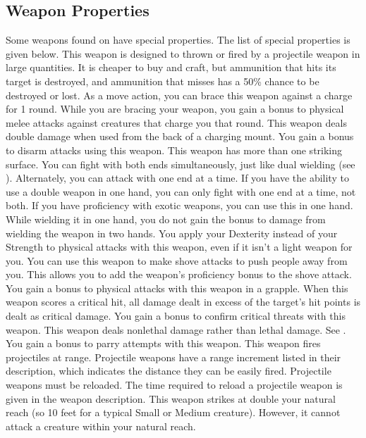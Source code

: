\subsection{Weapon Properties}
Some weapons found on  have special properties. The list of special properties is given below.
 This weapon is designed to thrown or fired by a projectile weapon in large quantities. It is cheaper to buy and craft, but ammunition that hits its target is destroyed, and ammunition that misses has a 50\% chance to be destroyed or lost.
 As a move action, you can brace this weapon against a charge for 1 round. While you are bracing your weapon, you gain a  bonus to physical melee attacks against creatures that charge you that round.
 This weapon deals double damage when used from the back of a charging mount.
 You gain a  bonus to disarm attacks using this weapon.
 This weapon has more than one striking surface. You can fight with both ends simultaneously, just like dual wielding (see ). Alternately, you can attack with one end at a time. If you have the ability to use a double weapon in one hand, you can only fight with one end at a time, not both.
 If you have proficiency with exotic weapons, you can use this in one hand. While wielding it in one hand, you do not gain the  bonus to damage from wielding the weapon in two hands.
 You apply your Dexterity instead of your Strength to physical attacks with this weapon, even if it isn't a light weapon for you.
 You can use this weapon to make shove attacks to push people away from you. This allows you to add the weapon's proficiency bonus to the shove attack.
 You gain a  bonus to physical attacks with this weapon in a grapple.
 When this weapon scores a critical hit, all damage dealt in excess of the target's hit points is dealt as critical damage.
 You gain a  bonus to confirm critical threats with this weapon.
 This weapon deals nonlethal damage rather than lethal damage. See .
 You gain a  bonus to parry attempts with this weapon.
 This weapon fires projectiles at range. Projectile weapons have a range increment listed in their description, which indicates the distance they can be easily fired. Projectile weapons must be reloaded. The time required to reload a projectile weapon is given in the weapon description.
 This weapon strikes at double your natural reach (so 10 feet for a typical Small or Medium creature). However, it cannot attack a creature within your natural reach.


